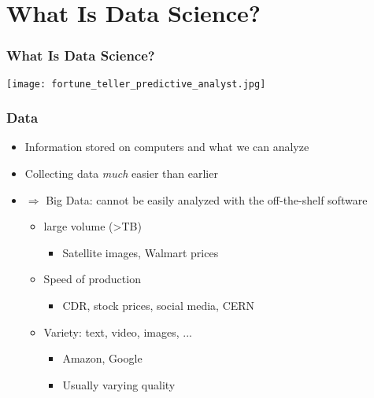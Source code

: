 \documentclass[mathserif, xcolor=table, svgnames]{beamer}
\begin{document}
\section[Topic]{What Is Data Science?}

\begin{frame}
  \frametitle{What Is Data Science?}
  \begin{center}
    \texttt{[image: fortune\_teller\_predictive\_analyst.jpg]}
  \end{center}
\end{frame}


\begin{frame}
\frametitle{Data}
\begin{itemize}
\item Information stored on computers and what we can analyze
\item Collecting data \emph{much} easier than earlier
\item $\Rightarrow$ Big Data: cannot be easily analyzed with the off-the-shelf
  software
  \begin{itemize}
  \item large volume (>TB)
    \begin{itemize}
    \item Satellite images, Walmart prices
    \end{itemize}
  \item Speed of production
    \begin{itemize}
    \item CDR, stock prices, social media, CERN
    \end{itemize}
  \item Variety: text, video, images, ...
    \begin{itemize}
    \item Amazon, Google
    \item Usually varying quality
    \end{itemize}
  \end{itemize}
\end{itemize}
\end{frame}
\end{document}
